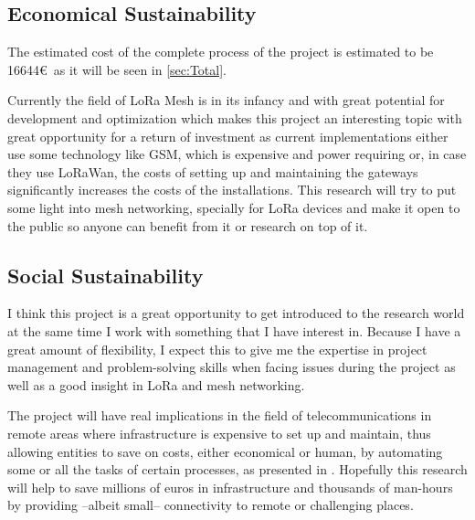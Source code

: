\subsection{Economical Sustainability}
The estimated cost of the complete process of the project is estimated to be 16644\euro\ as it will be seen in \autoref{sec:Total}.

Currently the field of LoRa Mesh is in its infancy and with great potential for development and optimization which makes this project an interesting topic with great opportunity for a return of investment as current implementations either use some technology like GSM, which is expensive and power requiring or, in case they use LoRaWan, the costs of setting up and maintaining the gateways significantly increases the costs of the installations. This research will try to put some light into mesh networking, specially for LoRa devices and make it open to the public so anyone can benefit from it or research on top of it.

\subsection{Social Sustainability}
I think this project is a great opportunity to get introduced to the research world at the same time I work with something that I have interest in. Because I have a great amount of flexibility, I expect this to give me the expertise in project management and problem-solving skills when facing issues during the project as well as a good insight in LoRa and mesh networking.

The project will have real implications in the field of telecommunications in remote areas where infrastructure is expensive to set up and maintain, thus allowing entities to save on costs, either economical or human, by automating some or all the tasks of certain processes, as presented in \cite{LoRaMoto}. Hopefully this research will help to save millions of euros in infrastructure and thousands of man-hours by providing --albeit small-- connectivity to remote or challenging places.